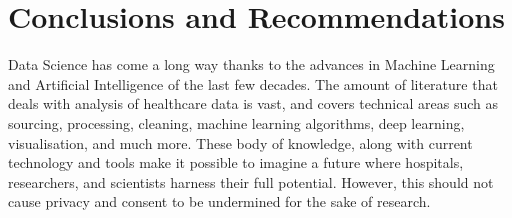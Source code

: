 \documentclass[a4paper,12pt]{article}
\begin{document}


\section{Conclusions and Recommendations}

Data Science has come a long way thanks to the advances in Machine Learning and Artificial Intelligence of the last few decades. The amount of literature that deals with analysis of healthcare data is vast, and covers technical areas such as sourcing, processing, cleaning, machine learning algorithms, deep learning, visualisation, and much more. These body of knowledge, along with current technology and tools make it possible to imagine a future where hospitals, researchers, and scientists harness their full potential. However, this should not cause privacy and consent to be undermined for the sake of research.

\pagebreak
\printbibliography
\end{document}
